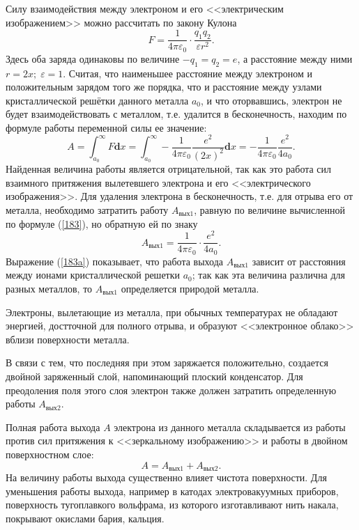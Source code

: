 \documentclass[a4paper,10pt]{book}
\begin{document}
Силу взаимодействия между электроном и его <<электрическим изображением>> можно рассчитать по закону Кулона
\begin{equation*}
 F = \frac{1}{4\pi\varepsilon_0}\cdot\frac{q_1q_2}{\varepsilon r^2}.
\end{equation*}
Здесь оба заряда одинаковы по величине $-q_1 = q_2 = e$, а расстояние между ними $r = 2x;\;\varepsilon=1$. Считая, что наименьшее расстояние между электроном и положительным зарядом того же порядка, что и расстояние между узлами кристаллической решётки данного металла $a_0$, и что оторвавшись, электрон не будет взаимодействовать с металлом, т.е. удалится в бесконечность, находим по формуле работы переменной силы ее значение:
\begin{equation}\label{183}
 A = \int_{a_0}^\infty F\mathbf{d}x = \int_{a_0}^\infty - \frac{1}{4\pi\varepsilon_0}\frac{e^2}{(2x)^2}\mathbf{d}x = -\frac{1}{4\pi\varepsilon_0}\frac{e^2}{4a_0}.
\end{equation}
Найденная величина работы является отрицательной, так как это работа сил взаимного притяжения вылетевшего электрона и его <<электрического изображения>>. Для удаления электрона в бесконечность, т.е. для отрыва его от металла, необходимо затратить работу $A_\text{вых1}$, равную по величине вычисленной по формуле (\ref{183}), но обратную ей по знаку
\begin{equation}\label{183a}
 A_\text{вых1} = \frac{1}{4\pi\varepsilon_0}\cdot\frac{e^2}{4a_0}.
\end{equation}
Выражение (\ref{183a}) показывает, что работа выхода $A_\text{вых1}$ зависит от расстояния между ионами кристаллической решетки $a_0$; так как эта величина различна для разных металлов, то $A_\text{вых1}$ определяется природой металла.

Электроны, вылетающие из металла, при обычных температурах не обладают энергией, достточной для полного отрыва, и образуют <<электронное облако>> вблизи поверхности металла.

В связи с тем, что последняя при этом заряжается положительно, создается двойной заряженный слой, напоминающий плоский конденсатор. Для преодоления поля этого слоя электрон также должен затратить определенную работы $A_\text{вых2}$.

Полная работа выхода $A$ электрона из данного металла складывается из работы против сил притяжения к <<зеркальному изображению>> и работы в двойном поверхностном слое:
\begin{equation*}
 A = A_\text{вых1} + A_\text{вых2}.
\end{equation*}
На величину работы выхода существенно влияет чистота поверхности. Для уменьшения работы выхода, например в катодах электровакуумных приборов, поверхность тугоплавкого вольфрама, из которого изготавливают нить накала, покрывают окислами бария, кальция.
\end{document}
